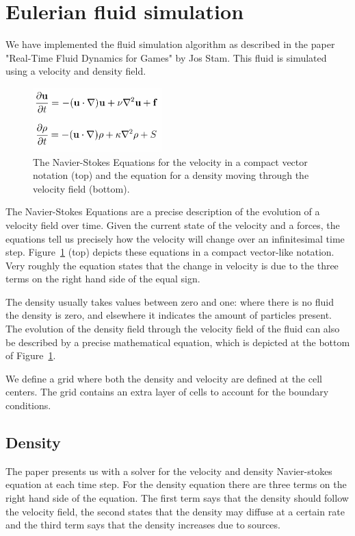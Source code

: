 \section{Eulerian fluid simulation}

We have implemented the fluid simulation algorithm as described in the paper "Real-Time Fluid Dynamics for Games" by Jos Stam.
This fluid is simulated using a velocity and density field.

\begin{figure}[h]
    \centering
    \includegraphics[width=5cm]{img/navierstokes.png}
    \caption{The Navier-Stokes Equations for the velocity in a compact vector notation (top) and the equation for a density moving through the velocity field (bottom).}
    \label{fig:navierstokes}
\end{figure}

\noindent The Navier-Stokes Equations are a precise description of the evolution of a velocity field over time.
Given the current state of the velocity and a forces, the equations tell us precisely how the velocity will change over an infinitesimal time step.
Figure~\ref{fig:navierstokes} (top) depicts these equations in a compact vector-like notation.
Very roughly the equation states that the change in velocity is due to the three terms on the right hand side of the equal sign.

\noindent The density usually takes values between zero and one: where there is no fluid the density is zero, and elsewhere it indicates the amount of particles present.
The evolution of the density field through the velocity field of the fluid can also be described by a precise mathematical equation,
which is depicted at the bottom of Figure~\ref{fig:navierstokes}.

\noindent We define a grid where both the density and velocity are defined at the cell centers.
The grid contains an extra layer of cells to account for the boundary conditions.

\subsection{Density}
The paper presents us with a solver for the velocity and density Navier-stokes equation at each time step.
For the density equation there are three terms on the right hand side of the equation.
The first term says that the density should follow the velocity field, the second states that the density may diffuse at a certain rate and the third term says that the density increases due to sources.

